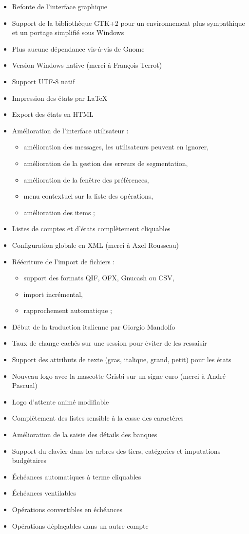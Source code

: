 \begin{itemize}
	\item Refonte de l'interface graphique
	\item Support de la bibliothèque GTK+2 pour un environnement plus sympathique et un portage simplifié sous Windows
	\item Plus aucune dépendance vis-à-vis de Gnome
	\item Version Windows native (merci à François Terrot)
	\item Support \gls{UTF-8} natif
	\item Impression des états par \gls{LaTeX}
	\item Export des états en \gls{HTML}
	\item Amélioration de l'interface utilisateur :
		\begin{itemize}
		\item amélioration des messages, les utilisateurs peuvent en ignorer,
		\item amélioration de la gestion des erreurs de segmentation,
		\item amélioration de la fenêtre des préférences,
		\item menu contextuel sur la liste des opérations,
		\item amélioration des items ;
		\end{itemize}
	\item Listes de comptes et d'états complètement cliquables
	\item Configuration globale en \gls{XML} (merci à Axel Rousseau)
	\item Réécriture de l'import de fichiers :
		\begin{itemize}
		\item support des formats \gls{QIF}, \gls{OFX}, \gls{Gnucash} ou \gls{CSV},
		\item import incrémental,
		\item rapprochement automatique ;
		\end{itemize}
	\item Début de la traduction italienne par Giorgio Mandolfo
	\item Taux de change cachés sur une session pour éviter de les
	ressaisir
	\item Support des attributs de texte (gras, italique, grand, petit) pour les états
	\item Nouveau logo avec la mascotte Grisbi sur un signe euro (merci à André Pascual)
	\item Logo d'attente animé modifiable
	\item Complètement des listes sensible à la casse des caractères
	\item Amélioration de la saisie des détails des banques
	\item Support du clavier dans les arbres des tiers, catégories et imputations
	budgétaires
	\item Échéances automatiques à terme cliquables
	\item Échéances ventilables
	\item Opérations convertibles en échéances
	\item Opérations déplaçables dans un autre compte
\end{itemize}


